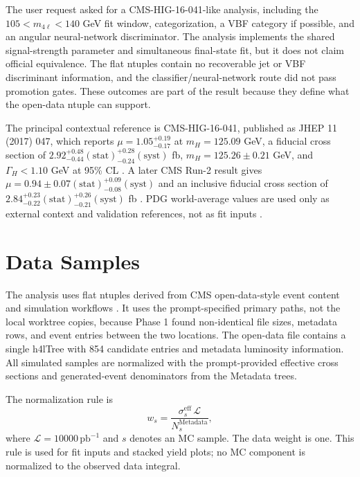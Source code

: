 \documentclass[11pt]{article}
\begin{document}
The user request asked for a CMS-HIG-16-041-like analysis, including the $105<m_{4\ell}<140$ GeV fit window, categorization, a VBF category if possible, and an angular neural-network discriminator. The analysis implements the shared signal-strength parameter and simultaneous final-state fit, but it does not claim official equivalence. The flat ntuples contain no recoverable jet or VBF discriminant information, and the classifier/neural-network route did not pass promotion gates. These outcomes are part of the result because they define what the open-data ntuple can support.

The principal contextual reference is CMS-HIG-16-041, published as JHEP 11 (2017) 047, which reports $\mu=1.05^{+0.19}_{-0.17}$ at $m_H=125.09$ GeV, a fiducial cross section of $2.92^{+0.48}_{-0.44}\mathrm{(stat)}^{+0.28}_{-0.24}\mathrm{(syst)}$ fb, $m_H=125.26\pm0.21$ GeV, and $\Gamma_H<1.10$ GeV at 95\% CL \cite{CMS-HIG-16-041}. A later CMS Run-2 result gives $\mu=0.94\pm0.07\mathrm{(stat)}^{+0.09}_{-0.08}\mathrm{(syst)}$ and an inclusive fiducial cross section of $2.84^{+0.23}_{-0.22}\mathrm{(stat)}^{+0.26}_{-0.21}\mathrm{(syst)}$ fb \cite{CMS-HIG-19-001}. PDG world-average values are used only as external context and validation references, not as fit inputs \cite{PDG2024}.
\section{Data Samples}
The analysis uses flat ntuples derived from CMS open-data-style event content and simulation workflows \cite{CMSDetector,CMSOpenData,GEANT4,PYTHIA8,POWHEG}. It uses the prompt-specified primary paths, not the local worktree copies, because Phase 1 found non-identical file sizes, metadata rows, and event entries between the two locations. The open-data file contains a single h4lTree with 854 candidate entries and metadata luminosity information. All simulated samples are normalized with the prompt-provided effective cross sections and generated-event denominators from the Metadata trees.

The normalization rule is
\begin{equation}
 w_s = \frac{\sigma^{\mathrm{eff}}_s\,\mathcal{L}}{N^{\mathrm{Metadata}}_s},
 \label{eq:mc-weight}
\end{equation}
where $\mathcal{L}=10000\,\mathrm{pb}^{-1}$ and $s$ denotes an MC sample. The data weight is one. This rule is used for fit inputs and stacked yield plots; no MC component is normalized to the observed data integral.
\end{document}
